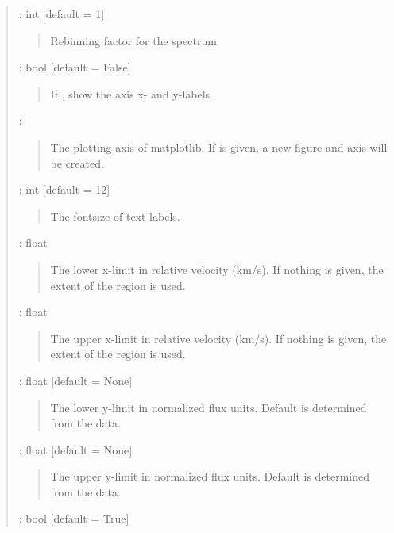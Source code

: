 \documentclass[letterpaper,10pt,english]{sphinxmanual}
\begin{document}
\begin{fulllineitems}
\begin{quote}
\begin{description}
 : int   {[}default = 1{]}
\begin{quote}

Rebinning factor for the spectrum
\end{quote}

 : bool   {[}default = False{]}
\begin{quote}

If , show the axis x- and y-labels.
\end{quote}

 : 
\begin{quote}

The plotting axis of matplotlib.
If  is given, a new figure and axis will be created.
\end{quote}

 : int   {[}default = 12{]}
\begin{quote}

The fontsize of text labels.
\end{quote}

 : float
\begin{quote}

The lower x-limit in relative velocity (km/s).
If nothing is given, the extent of the region is used.
\end{quote}

 : float
\begin{quote}

The upper x-limit in relative velocity (km/s).
If nothing is given, the extent of the region is used.
\end{quote}

 : float   {[}default = None{]}
\begin{quote}

The lower y-limit in normalized flux units.
Default is determined from the data.
\end{quote}

 : float   {[}default = None{]}
\begin{quote}

The upper y-limit in normalized flux units.
Default is determined from the data.
\end{quote}

 : bool   {[}default = True{]}
\begin{quote}


\end{quote}
\end{description}
\end{quote}
\end{fulllineitems}
\end{document}
